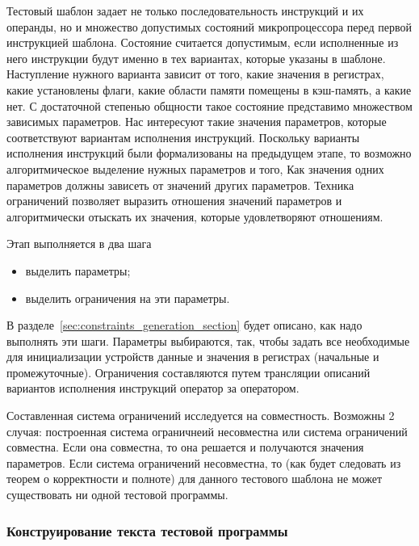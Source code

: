 Тестовый шаблон задает не только последовательность инструкций и их операнды, но и множество допустимых состояний микропроцессора перед первой инструкцией шаблона. Состояние считается допустимым, если исполненные из него инструкции будут именно в тех вариантах, которые указаны в шаблоне. Наступление нужного варианта зависит от того, какие значения в регистрах, какие установлены флаги, какие области памяти помещены в кэш-память, а какие нет. С достаточной степенью общности такое состояние представимо множеством зависимых параметров. Нас интересуют такие значения параметров, которые соответствуют вариантам исполнения инструкций. Поскольку варианты исполнения инструкций были формализованы на предыдущем этапе, то возможно алгоритмическое выделение нужных параметров и того, Как значения одних параметров должны зависеть от значений других параметров. Техника ограничений позволяет выразить отношения значений параметров и алгоритмически отыскать их значения, которые удовлетворяют отношениям.

Этап выполняется в два шага
\begin{itemize}
  \item выделить параметры;
  \item выделить ограничения на эти параметры.
\end{itemize}

В разделе~\ref{sec:constraints_generation_section} будет описано, как надо выполнять эти шаги. Параметры выбираются, так, чтобы задать все необходимые для инициализации устройств данные и значения в регистрах (начальные и промежуточные). Ограничения составляются путем трансляции описаний вариантов исполнения инструкций оператор за оператором.

Составленная система ограничений исследуется на совместность. Возможны 2 случая: построенная система ограничнеий несовместна или система ограничений совместна. Если она совместна, то она решается и получаются значения параметров. Если система ограничений несовместна, то (как будет следовать из теорем о корректности и полноте) для данного тестового шаблона не может существовать ни одной тестовой программы.

\subsubsection{Конструирование текста тестовой программы}

